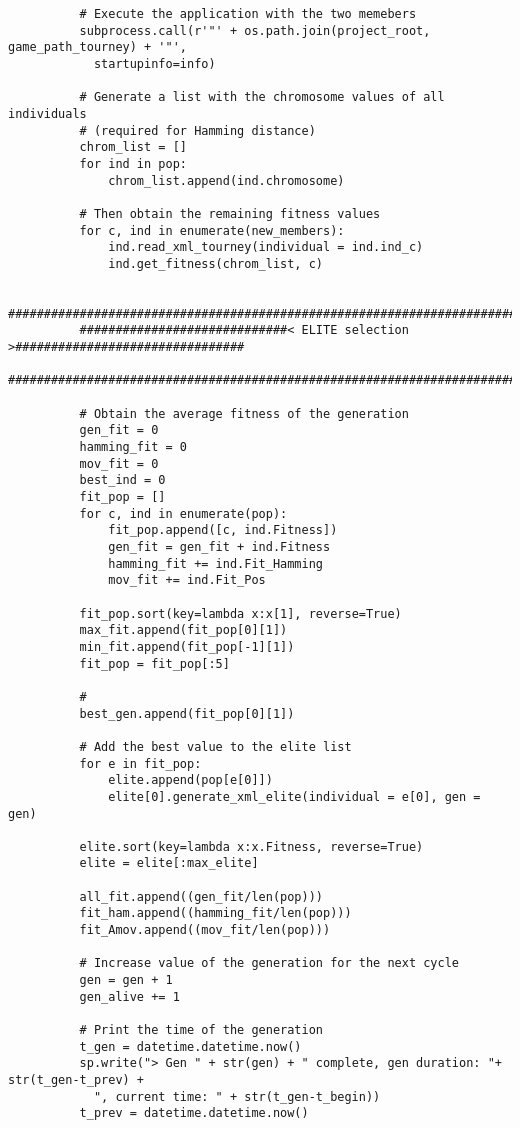 \begin{verbatim}
          # Execute the application with the two memebers
          subprocess.call(r'"' + os.path.join(project_root, game_path_tourney) + '"', 
            startupinfo=info)

          # Generate a list with the chromosome values of all individuals 
          # (required for Hamming distance)
          chrom_list = []
          for ind in pop:
              chrom_list.append(ind.chromosome)

          # Then obtain the remaining fitness values
          for c, ind in enumerate(new_members):
              ind.read_xml_tourney(individual = ind.ind_c)
              ind.get_fitness(chrom_list, c)

          ################################################################################
          #############################< ELITE selection >################################
          ################################################################################

          # Obtain the average fitness of the generation
          gen_fit = 0
          hamming_fit = 0
          mov_fit = 0
          best_ind = 0
          fit_pop = []
          for c, ind in enumerate(pop):
              fit_pop.append([c, ind.Fitness])
              gen_fit = gen_fit + ind.Fitness
              hamming_fit += ind.Fit_Hamming
              mov_fit += ind.Fit_Pos
          
          fit_pop.sort(key=lambda x:x[1], reverse=True)
          max_fit.append(fit_pop[0][1])
          min_fit.append(fit_pop[-1][1])
          fit_pop = fit_pop[:5]
          
          # 
          best_gen.append(fit_pop[0][1])

          # Add the best value to the elite list
          for e in fit_pop:
              elite.append(pop[e[0]])
              elite[0].generate_xml_elite(individual = e[0], gen = gen)

          elite.sort(key=lambda x:x.Fitness, reverse=True)
          elite = elite[:max_elite]

          all_fit.append((gen_fit/len(pop)))
          fit_ham.append((hamming_fit/len(pop)))
          fit_Amov.append((mov_fit/len(pop)))
          
          # Increase value of the generation for the next cycle
          gen = gen + 1
          gen_alive += 1

          # Print the time of the generation
          t_gen = datetime.datetime.now()
          sp.write("> Gen " + str(gen) + " complete, gen duration: "+ str(t_gen-t_prev) + 
            ", current time: " + str(t_gen-t_begin))
          t_prev = datetime.datetime.now()


\end{verbatim}
